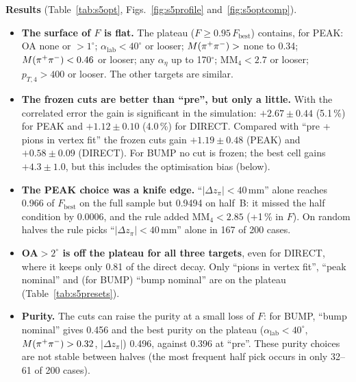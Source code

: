 \textbf{Results} (Table~\ref{tab:s5opt}, Figs.~\ref{fig:s5profile} and~\ref{fig:s5optcomp}).
\begin{itemize}
\item \textbf{The surface of $F$ is flat.} The plateau ($F\ge0.95\,F_{\mathrm{best}}$) contains, for PEAK:
      OA none or $>1^\circ$; $\alpha_{\mathrm{lab}}<40^\circ$ or looser; $M(\pi^{+}\pi^{-})>$ none to 0.34;
      $M(\pi^{+}\pi^{-})<0.46$ or looser; any $\alpha_\eta$ up to 170$^\circ$; $\mathrm{MM}_4<2.7$ or looser;
      $p_{T,4}>400$ or looser. The other targets are similar.
\item \textbf{The frozen cuts are better than ``pre'', but only a little.} With the correlated
      error the gain is significant in the simulation: $+2.67\pm0.44$ (5.1\,\%) for PEAK and
      $+1.12\pm0.10$ (4.0\,\%) for DIRECT. Compared with ``pre + pions in vertex fit'' the frozen
      cuts gain $+1.19\pm0.48$ (PEAK) and $+0.58\pm0.09$ (DIRECT). For BUMP no cut is frozen; the
      best cell gains $+4.3\pm1.0$, but this includes the optimisation bias (below).
\item \textbf{The PEAK choice was a knife edge.} ``$|\Delta z_\pi|<40$\,mm'' alone reaches 0.966 of
      $F_{\mathrm{best}}$ on the full sample but 0.9494 on half~B: it missed the half condition by
      0.0006, and the rule added $\mathrm{MM}_4<2.85$ (+1\,\% in $F$). On random halves the rule picks
      ``$|\Delta z_\pi|<40$\,mm'' alone in 167 of 200 cases.
\item \textbf{OA$>2^\circ$ is off the plateau for all three targets}, even for DIRECT, where it keeps
      only 0.81 of the direct decay. Only ``pions in vertex fit'', ``peak nominal'' and (for BUMP)
      ``bump nominal'' are on the plateau (Table~\ref{tab:s5presets}).
\item \textbf{Purity.} The cuts can raise the purity at a small loss of $F$: for BUMP, ``bump
      nominal'' gives 0.456 and the best purity on the plateau ($\alpha_{\mathrm{lab}}<40^\circ$,
      $M(\pi^{+}\pi^{-})>0.32$, $|\Delta z_\pi|$) 0.496, against 0.396 at ``pre''. These purity choices are not
      stable between halves (the most frequent half pick occurs in only 32--61 of 200 cases).
\end{itemize}

